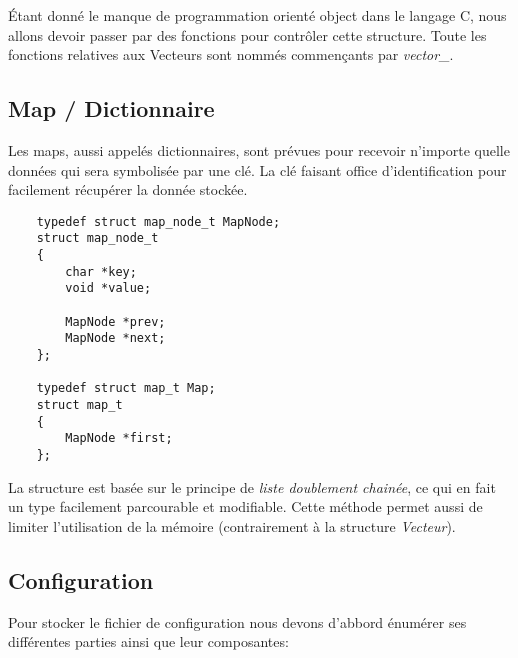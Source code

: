 \documentclass[conference]{IEEEtran}
\begin{document}
Étant donné le manque de programmation orienté object dans le langage C, nous allons devoir passer par des fonctions pour contrôler cette structure.
Toute les fonctions relatives aux Vecteurs sont nommés commençants par \textit{vector\_}.


\subsection{Map / Dictionnaire}

Les maps, aussi appelés dictionnaires, sont prévues pour recevoir n'importe quelle données qui sera symbolisée par une clé.
La clé faisant office d'identification pour facilement récupérer la donnée stockée.

\begin{lstlisting}
    typedef struct map_node_t MapNode;
    struct map_node_t
    {
        char *key;
        void *value;
    
        MapNode *prev;
        MapNode *next;
    };
    
    typedef struct map_t Map;
    struct map_t
    {
        MapNode *first;
    };
\end{lstlisting}

La structure est basée sur le principe de \textit{liste doublement chainée}, ce qui en fait un type facilement parcourable et modifiable.
Cette méthode permet aussi de limiter l'utilisation de la mémoire (contrairement à la structure \textit{Vecteur}).


\subsection{Configuration}

Pour stocker le fichier de configuration nous devons d'abbord énumérer ses différentes parties ainsi que leur composantes:
\end{document}
